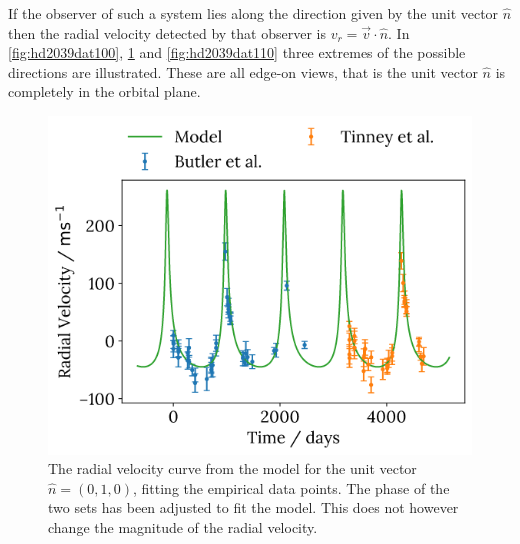 \documentclass{physics_article_B}
\begin{document}
If the observer of such a system lies along the direction given by the unit vector $\hat{n}$ then the radial velocity detected by that observer is $v_r = \vec{v} \cdot \hat{n}$. In \cref{fig:hd2039dat100}, \cref{fig:hd2039dat010} and \cref{fig:hd2039dat110} three extremes of the possible directions are illustrated. These are all edge-on views, that is the unit vector $\hat{n}$ is completely in the orbital plane.

\begin{figure}[H]
 \centering
 \includegraphics[width=0.6\linewidth]{hd2039dat010.png}
 \caption{The radial velocity curve from the model for the unit vector $\hat{n} = (0, 1, 0)$, fitting the empirical data points. The phase of the two sets has been adjusted to fit the model. This does not however change the magnitude of the radial velocity. }
 \label{fig:hd2039dat010}
\end{figure}
\end{document}
